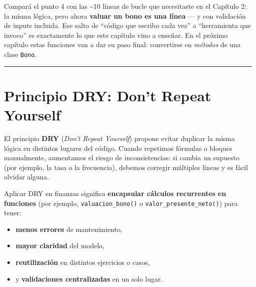 \documentclass[
  spanish,
  letterpaper,
  DIV=11,
  numbers=noendperiod]{scrreprt}
\providecommand{\tightlist}{%
  \setlength{\itemsep}{0pt}\setlength{\parskip}{0pt}}
\begin{document}
Compará el punto 4 con las \textasciitilde10 líneas de bucle que
necesitaste en el Capítulo 2: la misma lógica, pero ahora \textbf{valuar
un bono es una línea} --- y con validación de inputs incluida. Ese salto
de ``código que escribo cada vez'' a ``herramienta que invoco'' es
exactamente lo que este capítulo vino a enseñar. En el próximo capítulo
estas funciones van a dar su paso final: convertirse en \emph{métodos}
de una clase \texttt{Bono}.

\begin{center}\rule{0.5\linewidth}{0.5pt}\end{center}

\section{Principio DRY: Don't Repeat
Yourself}\label{principio-dry-dont-repeat-yourself}

El principio \textbf{DRY} (\emph{Don't Repeat Yourself}) propone evitar
duplicar la misma lógica en distintos lugares del código. Cuando
repetimos fórmulas o bloques manualmente, aumentamos el riesgo de
inconsistencias: si cambia un supuesto (por ejemplo, la tasa o la
frecuencia), debemos corregir múltiples líneas y es fácil olvidar
alguna.

Aplicar DRY en finanzas significa \textbf{encapsular cálculos
recurrentes en funciones} (por ejemplo, \texttt{valuacion\_bono()} o
\texttt{valor\_presente\_neto()}) para tener:

\begin{itemize}
\tightlist
\item
  \textbf{menos errores} de mantenimiento,
\item
  \textbf{mayor claridad} del modelo,
\item
  \textbf{reutilización} en distintos ejercicios o casos,
\item
  y \textbf{validaciones centralizadas} en un solo lugar.
\end{itemize}
\end{document}
